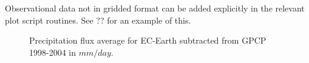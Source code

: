 \documentclass[12pt]{article}
\begin{document}
Observational data not in gridded format can be added explicitly in
the relevant plot script routines. See ?? for an example of this. 
%
%
\begin{figure}
\begin{center}
\caption{Precipitation flux average for EC-Earth subtracted from GPCP 
1998-2004 in $mm/day$.}\label{fig:surfconplot_ref_pr_mmday}
\end{center}
\end{figure}
\pagebreak






% 
% 

\end{document}
